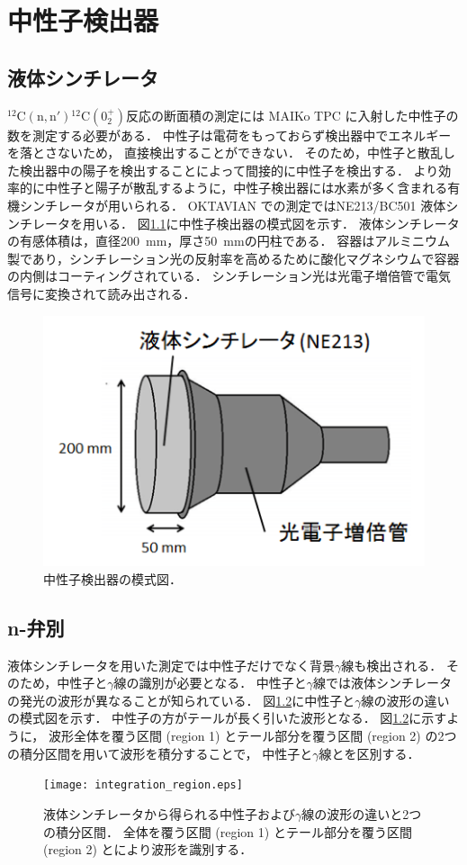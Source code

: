 \documentclass[../master]{subfiles}
\begin{document}
\chapter{中性子検出器}
\section{液体シンチレータ}
${}^{12}\mathrm{C}(\mathrm{n},\mathrm{n}'){}^{12}\mathrm{C} (0_2^+)$反応の断面積の測定には
MAIKo TPC に入射した中性子の数を測定する必要がある．
中性子は電荷をもっておらず検出器中でエネルギーを落とさないため，
直接検出することができない．
そのため，中性子と散乱した検出器中の陽子を検出することによって間接的に中性子を検出する．
より効率的に中性子と陽子が散乱するように，中性子検出器には水素が多く含まれる有機シンチレータが用いられる．
OKTAVIAN での測定ではNE213/BC501 液体シンチレータを用いる．
図\ref{fig::neutron_detector}に中性子検出器の模式図を示す．
液体シンチレータの有感体積は，直径\SI{200}{\milli\metre}，厚さ\SI{50}{\milli\metre}の円柱である．
容器はアルミニウム製であり，シンチレーション光の反射率を高めるために酸化マグネシウムで容器の内側はコーティングされている．
シンチレーション光は光電子増倍管で電気信号に変換されて読み出される．
\begin{figure}
  \centering
  \includegraphics[clip, width=0.6\columnwidth]{pic/neutron_detector.png}
  \caption{中性子検出器の模式図．}
  \label{fig::neutron_detector}
\end{figure}

\section{n-弁別}
液体シンチレータを用いた測定では中性子だけでなく背景$\gamma$線も検出される．
そのため，中性子と$\gamma$線の識別が必要となる．
中性子と$\gamma$線では液体シンチレータの発光の波形が異なることが知られている．
図\ref{fig::pulse_shape_n_gamma}に中性子と$\gamma$線の波形の違いの模式図を示す．
中性子の方がテールが長く引いた波形となる．
図\ref{fig::pulse_shape_n_gamma}に示すように，
波形全体を覆う区間 (region 1) とテール部分を覆う区間 (region 2) の2つの積分区間を用いて波形を積分することで，
中性子と$\gamma$線とを区別する．
\begin{figure}
  \centering
  \texttt{[image: integration\_region.eps]}
  \caption[液体シンチレータから得られる中性子および$\gamma$線の波形の違いと2つの積分区間．]
          {液体シンチレータから得られる中性子および$\gamma$線の波形の違いと2つの積分区間．
            全体を覆う区間 (region 1) とテール部分を覆う区間 (region 2) とにより波形を識別する．
          }
  \label{fig::pulse_shape_n_gamma} 
\end{figure}
\end{document}
